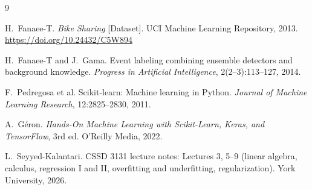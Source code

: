 \documentclass[11pt]{article}
\begin{document}
\begin{thebibliography}{9}

H.~Fanaee-T. \emph{Bike Sharing} [Dataset]. UCI Machine Learning Repository, 2013.
\url{https://doi.org/10.24432/C5W894}

H.~Fanaee-T and J.~Gama. Event labeling combining ensemble detectors and background knowledge.
\emph{Progress in Artificial Intelligence}, 2(2--3):113--127, 2014.

F.~Pedregosa et al. Scikit-learn: Machine learning in Python.
\emph{Journal of Machine Learning Research}, 12:2825--2830, 2011.

A.~G\'eron. \emph{Hands-On Machine Learning with Scikit-Learn, Keras, and TensorFlow}, 3rd ed. O'Reilly Media, 2022.

L.~Seyyed-Kalantari. CSSD 3131 lecture notes: Lectures 3, 5--9 (linear algebra, calculus,
regression I and II, overfitting and underfitting, regularization). York University, 2026.

\end{thebibliography}
\end{document}
